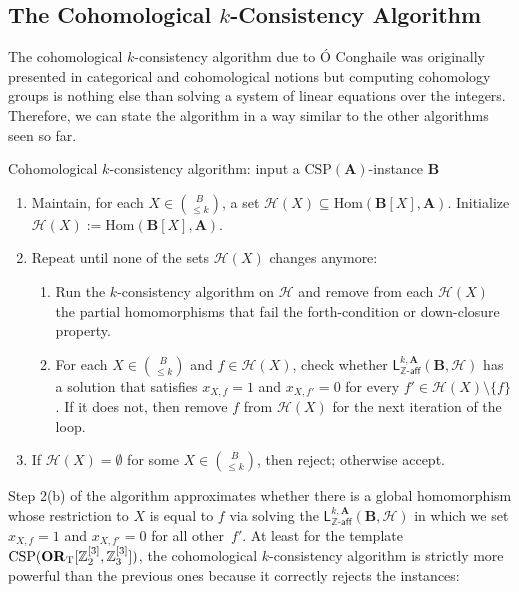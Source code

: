 \documentclass[a4paper,english, thm-restate]{lipics-v2021}
\newcommand{\ZZ}{\mathbb{Z}}
\newcommand{\StructA}{\mathbf{A}}
\newcommand{\StructB}{\mathbf{B}}
\newcommand{\CSP}[1]{\mathrm{CSP}(#1)}
\newcommand{\Hom}[2]{\mathrm{Hom}(#1,#2)}
\newcommand{\leqs}{\mathsf{L}}
\newcommand{\zafkleq}[4]{\leqs^{#1,#2}_{\ZZ\mathsf{\text{-}aff}}(#3,#4)}
\newcommand{\Hh}{\mathcal{H}}
\begin{document}
	\subsection{The Cohomological \texorpdfstring{$k$}{k}-Consistency Algorithm}
	\label{sec:cohomology}
	The cohomological $k$-consistency algorithm due to Ó Conghaile \cite{OConghaile22} was originally presented in categorical and cohomological notions but computing cohomology groups is nothing else than solving a system of linear equations over the integers.
	Therefore, we can state the algorithm in a way similar to the other algorithms seen so far.
	\begin{algobox}{Cohomological $k$-consistency algorithm:
			input a $\CSP{\StructA}$-instance $\StructB$}
		\begin{enumerate}
			\item Maintain, for each $X \in \binom{B}{ \leq k}$, a set $\Hh(X) \subseteq \Hom{\StructB[X]}{\StructA}$. Initialize $\Hh(X) := \Hom{\StructB[X]}{\StructA}$.
			\item Repeat until none of the sets $\Hh(X)$ changes anymore: 
			\begin{enumerate}
				\item Run the $k$-consistency algorithm on $\Hh$ and remove from each $\Hh(X)$ the partial homomorphisms that fail the forth-condition or down-closure property.
				\item For each $X \in \binom{B}{ \leq k}$ and $f \in \Hh(X)$, check whether $\zafkleq{k}{\StructA}{\StructB}{\Hh}$ has a solution that satisfies $x_{X,f} = 1$ and $x_{X,f'} = 0$ for every $f' \in \Hh(X) \setminus \{f\}$. If it does not, then remove $f$ from $\Hh(X)$ for the next iteration of the loop. 
			\end{enumerate}	
			\item If $\Hh(X) = \emptyset$ for some $X \in \binom{B}{\leq k}$, then reject; otherwise accept. 
		\end{enumerate}
	\end{algobox}
	\noindent Step 2(b) of the algorithm approximates whether
	there is a global homomorphism whose restriction to $X$ is equal to $f$
	via solving the $\zafkleq{k}{\StructA}{\StructB}{\Hh}$
	in which we set $x_{X,f} = 1$ and $x_{X,f'} = 0$ for all other~$f'$.
	At least for the template $\CSP{\ZtwoOrThreeInst}$, the  cohomological $k$-consistency algorithm is strictly more powerful than the previous ones because it correctly rejects the instances:
	
\end{document}
